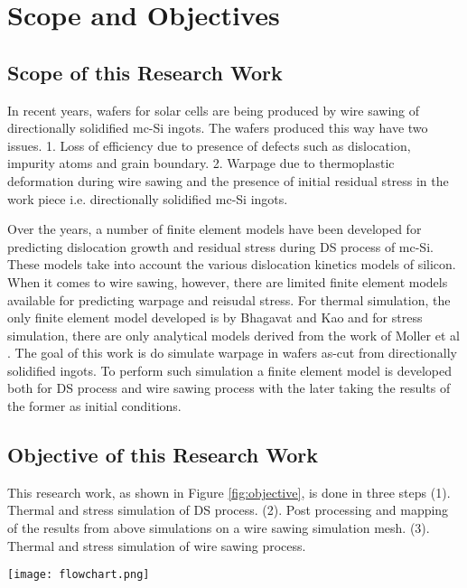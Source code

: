 \chapter{Scope and Objectives}
\section{Scope of this Research Work}

In recent years, wafers for solar cells are being produced by wire sawing of directionally solidified mc-Si ingots. The wafers produced this way have two issues. 1. Loss of efficiency due to presence of defects such as dislocation, impurity atoms and grain boundary. 2. Warpage due to thermoplastic deformation during wire sawing and the presence of initial residual stress in the work piece i.e. directionally solidified mc-Si ingots.

Over the years, a number of finite element models have been developed for predicting dislocation growth and residual stress during DS process of mc-Si. These models take into account the various dislocation kinetics models of silicon. When it comes to wire sawing, however, there are limited finite element models available for predicting warpage and reisudal stress. For thermal simulation, the only finite element model developed is by Bhagavat and Kao \cite{} and for stress simulation, there are only analytical models derived from the work of Moller et al \cite{}. The goal of this work is do simulate warpage in wafers as-cut from directionally solidified ingots. To perform such simulation a finite element model is developed both for DS process and wire sawing process with the later taking the results of the former as initial conditions.


\section{Objective of this Research Work}
This research work, as shown in Figure \ref{fig:objective}, is done in three steps
\newline
(1). Thermal and stress simulation of DS process.
\newline
(2). Post processing and mapping of the results from above simulations on a wire sawing simulation mesh.
\newline
(3). Thermal and stress simulation of wire sawing process.
\newline
\newline
\noindent
\begin{minipage}[c]{\textwidth}
\centering
        \captionsetup{type=figure}
        \texttt{[image: flowchart.png]}
        \label{fig:objective}
 \end{minipage}
 
